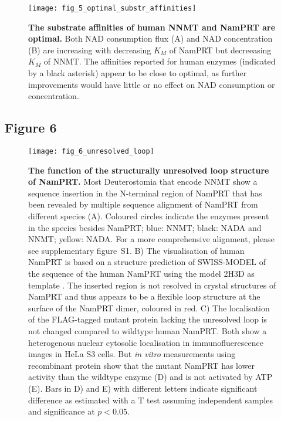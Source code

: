 \begin{figure}[ht]
  \centering
  \texttt{[image: fig\_5\_optimal\_substr\_affinities]}
  \caption{\textbf{The substrate affinities of human NNMT and NamPRT are optimal.} Both NAD consumption flux (A) and NAD concentration (B) are increasing with decreasing $K_M$ of NamPRT but decreeasing $K_M$ of NNMT. The affinities reported for human enzymes (indicated by a black asterisk) appear to be close to optimal, as further improvements would have little or no effect on NAD consumption or concentration.}
  \label{fig:optimal_substr_affinities}
\end{figure}

\newpage


\subsection{Figure 6}

\begin{figure}[ht]
  \centering
  \texttt{[image: fig\_6\_unresolved\_loop]}
  \caption{\textbf{The function of the structurally unresolved loop structure of NamPRT.} Most Deuterostomia that encode NNMT show a sequence insertion in the N-terminal region of NamPRT that has been revealed by multiple sequence alignment of NamPRT from different species (A). Coloured circles indicate the enzymes present in the species besides NamPRT; blue: NNMT; black: NADA and NNMT; yellow: NADA. For a more comprehensive alignment, please see supplementary figure~S1. B) The visualisation of human NamPRT is based on a structure prediction of SWISS-MODEL \cite{Arnold2006,Biasini2014} of the sequence of the human NamPRT using the model 2H3D as template \cite{Wang2006}. The inserted region is not resolved in crystal structures of NamPRT and thus appears to be a flexible loop structure at the surface of the NamPRT dimer, coloured in red. C) The localisation of the FLAG-tagged mutant protein lacking the unresolved loop is not changed compared to wildtype human NamPRT. Both show a heterogenous nuclear cytosolic localisation in immunofluerescence images in HeLa S3 cells. But \textit{in vitro} measurements using recombinant protein show that the mutant NamPRT has lower activity than the wildtype enzyme (D) and is not activated by ATP (E). Bars in D) and E) with different letters indicate significant difference as estimated with a T test assuming independent samples and significance at $p < 0.05$.}
  \label{fig:unresolved_loop}
\end{figure}

